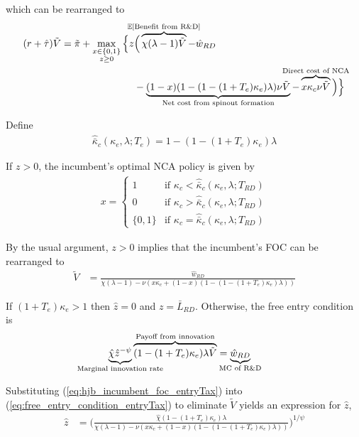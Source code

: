 \documentclass[11pt,english]{article}
\begin{document}
which can be rearranged to
\begin{align}
(r + \hat{\tau}) \tilde{V} = \tilde{\pi} + \max_{\substack{x \in \{0,1\} \\ z \ge 0}} \Big\{z &\Big( \overbrace{\chi (\lambda - 1) \tilde{V}}^{\mathclap{\mathbb{E}[\textrm{Benefit from R\&D}]}}- \hat{w}_{RD} \\
&-  \underbrace{(1-x)(1 - (1-(1+T_e)\kappa_{e})\lambda)\nu \tilde{V}}_{\mathclap{\text{Net cost from spinout formation}}} - \overbrace{x \kappa_{c} \nu \tilde{V}}^{\mathclap{\text{Direct cost of NCA}}}\Big) \Big\} \label{eq:hjb_incumbent_entryTax_2}
\end{align}

Define
\begin{align}
\hat{\bar{\kappa}}_c(\kappa_e,\lambda;T_e) = 1 - (1-(1+T_e)\kappa_e)\lambda  \label{eq:barkappa_entryTax}
\end{align} 

If $z > 0$, the incumbent's optimal NCA policy is given by 
\begin{align}
x = \begin{cases}
1 & \textrm{if } \kappa_{c} < \hat{\bar{\kappa}}_c (\kappa_e, \lambda;T_{RD}) \\
0 & \textrm{if } \kappa_{c} > \hat{\bar{\kappa}}_c (\kappa_e, \lambda;T_{RD})\\
\{0,1\} & \textrm{if } \kappa_c = \hat{\bar{\kappa}}_c (\kappa_e, \lambda;T_{RD})
\end{cases} \label{eq:nca_policy_entryTax}
\end{align}

By the usual argument, $z > 0$ implies that the incumbent's FOC can be rearranged to
\begin{align}
\tilde{V} &= \frac{\hat{w}_{RD}}{\chi(\lambda -1) - \nu (x\kappa_c + (1-x)(1 - (1-(1+T_e)\kappa_e)\lambda)) } \label{eq:hjb_incumbent_foc_entryTax}
\end{align}

If $(1 + T_e) \kappa_e > 1$ then $\hat{z} = 0$ and $z = \bar{L}_{RD}$. Otherwise, the free entry condition is
\begin{align}
\underbrace{\hat{\chi} \hat{z}^{-\psi}}_{\mathclap{\text{Marginal innovation rate}}} \overbrace{(1-(1+T_e)\kappa_e) \lambda \tilde{V}}^{\mathclap{\text{Payoff from innovation}}} &= \underbrace{\hat{w}_{RD}}_{\mathclap{\text{MC of R\&D}}} \label{eq:free_entry_condition_entryTax}
\end{align}

Substituting (\ref{eq:hjb_incumbent_foc_entryTax}) into (\ref{eq:free_entry_condition_entryTax}) to eliminate $\tilde{V}$ yields an expression for $\hat{z}$, 
\begin{align}
\hat{z} &= \Bigg( \frac{\hat{\chi} (1-(1+T_e)\kappa_{e}) \lambda}{\chi(\lambda -1) - \nu (x\kappa_c + (1-x)(1 - (1-(1+T_e)\kappa_e)\lambda)) } \Bigg)^{1/\psi} \label{eq:effort_entrant_entryTax}
\end{align}
\end{document}
